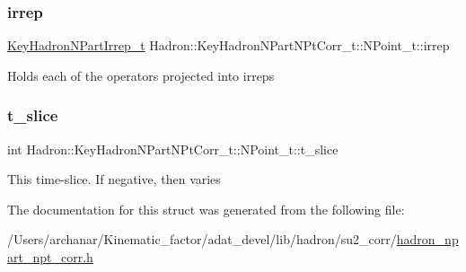 \subsubsection{\texorpdfstring{irrep}{irrep}}
{\footnotesize\ttfamily \mbox{\hyperlink{structHadron_1_1KeyHadronNPartIrrep__t}{Key\+Hadron\+N\+Part\+Irrep\+\_\+t}} Hadron\+::\+Key\+Hadron\+N\+Part\+N\+Pt\+Corr\+\_\+t\+::\+N\+Point\+\_\+t\+::irrep}

Holds each of the operators projected into irreps \mbox{\label{structHadron_1_1KeyHadronNPartNPtCorr__t_1_1NPoint__t_a9deb6b9a180b16925cccb4c08b1b8fdd}} 
\subsubsection{\texorpdfstring{t\_slice}{t\_slice}}
{\footnotesize\ttfamily int Hadron\+::\+Key\+Hadron\+N\+Part\+N\+Pt\+Corr\+\_\+t\+::\+N\+Point\+\_\+t\+::t\+\_\+slice}

This time-\/slice. If negative, then varies 

The documentation for this struct was generated from the following file\+:\begin{DoxyCompactItemize}
\item 
/\+Users/archanar/\+Kinematic\+\_\+factor/adat\+\_\+devel/lib/hadron/su2\+\_\+corr/\mbox{\hyperlink{lib_2hadron_2su2__corr_2hadron__npart__npt__corr_8h}{hadron\+\_\+npart\+\_\+npt\+\_\+corr.\+h}}\end{DoxyCompactItemize}
